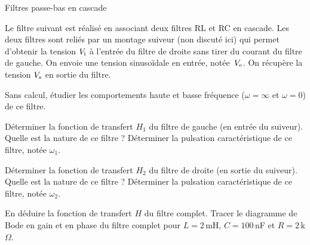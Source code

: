 \begin{exo}[MPSI]{Filtres passe-bas en cascade}

Le filtre suivant est réalisé en associant deux filtres RL et RC en cascade. Les deux filtres sont reliés par un montage suiveur (non discuté ici) qui permet d'obtenir la tension $V_{\rm i}$ à l'entrée du filtre de droite sans tirer du courant du filtre de gauche. On envoie une tension sinusoïdale en entrée, notée~$V_{ \rm e}$. On récupère la tension $V_{\rm s}$ en sortie du filtre.

\begin{center}

\end{center}

\begin{quest}
\item Sans calcul, étudier les comportements haute et basse fréquence ($\omega=\infty$ et $\omega=0$) de ce filtre.



\item Déterminer la fonction de transfert $H_1$ du filtre de gauche (en entrée du suiveur). Quelle est la nature de ce filtre ? Déterminer la pulsation caractéristique de ce filtre, notée $\omega_1$.


\item Déterminer la fonction de transfert $H_2$ du filtre de droite (en sortie du suiveur). Quelle est la nature de ce filtre ?  Déterminer la pulsation caractéristique de ce filtre, notée $\omega_2$.


\item En déduire la fonction de transfert $H$ du filtre complet. Tracer le diagramme de Bode en gain et en phase du filtre complet pour $L=2\,$mH, $C=100\,$nF et $R=2\,$k$\Omega$.


\end{quest}
\end{exo}

